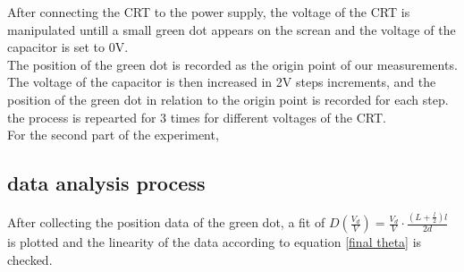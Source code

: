 \documentclass[12pt]{article}
\begin{document}
After connecting the CRT to the power supply, the voltage of the CRT is manipulated untill a small green dot appears on the screan and the voltage of the capacitor is set to 0V.\\
The position of the green dot is recorded as the origin point of our measurements.\\
The voltage of the capacitor is then increased in 2V steps increments, and the position of the green dot in relation to the origin point is recorded for each step.\\
the process is repearted for 3 times for different voltages of the CRT.\\ 

For the second part of the experiment, 


\subsection{data analysis process}
After collecting the position data of the green dot, a fit of $D(\frac{V_d}{V}) = \frac{V_d}{V} \cdot \frac{(L + \frac{l}{2})l}{2d}$ is plotted and the linearity of the data according to equation \eqref{final theta} is checked.\\
\end{document}
